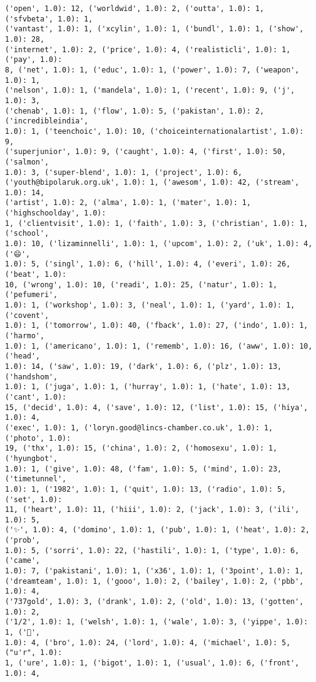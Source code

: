 \documentclass[11pt]{article}
\begin{document}
\begin{Verbatim}[commandchars=\\\{\}]
('open', 1.0): 12, ('worldwid', 1.0): 2, ('outta', 1.0): 1, ('sfvbeta', 1.0): 1,
('vantast', 1.0): 1, ('xcylin', 1.0): 1, ('bundl', 1.0): 1, ('show', 1.0): 28,
('internet', 1.0): 2, ('price', 1.0): 4, ('realisticli', 1.0): 1, ('pay', 1.0):
8, ('net', 1.0): 1, ('educ', 1.0): 1, ('power', 1.0): 7, ('weapon', 1.0): 1,
('nelson', 1.0): 1, ('mandela', 1.0): 1, ('recent', 1.0): 9, ('j', 1.0): 3,
('chenab', 1.0): 1, ('flow', 1.0): 5, ('pakistan', 1.0): 2, ('incredibleindia',
1.0): 1, ('teenchoic', 1.0): 10, ('choiceinternationalartist', 1.0): 9,
('superjunior', 1.0): 9, ('caught', 1.0): 4, ('first', 1.0): 50, ('salmon',
1.0): 3, ('super-blend', 1.0): 1, ('project', 1.0): 6,
('youth@bipolaruk.org.uk', 1.0): 1, ('awesom', 1.0): 42, ('stream', 1.0): 14,
('artist', 1.0): 2, ('alma', 1.0): 1, ('mater', 1.0): 1, ('highschoolday', 1.0):
1, ('clientvisit', 1.0): 1, ('faith', 1.0): 3, ('christian', 1.0): 1, ('school',
1.0): 10, ('lizaminnelli', 1.0): 1, ('upcom', 1.0): 2, ('uk', 1.0): 4, ('😄',
1.0): 5, ('singl', 1.0): 6, ('hill', 1.0): 4, ('everi', 1.0): 26, ('beat', 1.0):
10, ('wrong', 1.0): 10, ('readi', 1.0): 25, ('natur', 1.0): 1, ('pefumeri',
1.0): 1, ('workshop', 1.0): 3, ('neal', 1.0): 1, ('yard', 1.0): 1, ('covent',
1.0): 1, ('tomorrow', 1.0): 40, ('fback', 1.0): 27, ('indo', 1.0): 1, ('harmo',
1.0): 1, ('americano', 1.0): 1, ('rememb', 1.0): 16, ('aww', 1.0): 10, ('head',
1.0): 14, ('saw', 1.0): 19, ('dark', 1.0): 6, ('plz', 1.0): 13, ('handshom',
1.0): 1, ('juga', 1.0): 1, ('hurray', 1.0): 1, ('hate', 1.0): 13, ('cant', 1.0):
15, ('decid', 1.0): 4, ('save', 1.0): 12, ('list', 1.0): 15, ('hiya', 1.0): 4,
('exec', 1.0): 1, ('loryn.good@lincs-chamber.co.uk', 1.0): 1, ('photo', 1.0):
19, ('thx', 1.0): 15, ('china', 1.0): 2, ('homosexu', 1.0): 1, ('hyungbot',
1.0): 1, ('give', 1.0): 48, ('fam', 1.0): 5, ('mind', 1.0): 23, ('timetunnel',
1.0): 1, ('1982', 1.0): 1, ('quit', 1.0): 13, ('radio', 1.0): 5, ('set', 1.0):
11, ('heart', 1.0): 11, ('hiii', 1.0): 2, ('jack', 1.0): 3, ('ili', 1.0): 5,
('✨', 1.0): 4, ('domino', 1.0): 1, ('pub', 1.0): 1, ('heat', 1.0): 2, ('prob',
1.0): 5, ('sorri', 1.0): 22, ('hastili', 1.0): 1, ('type', 1.0): 6, ('came',
1.0): 7, ('pakistani', 1.0): 1, ('x36', 1.0): 1, ('3point', 1.0): 1,
('dreamteam', 1.0): 1, ('gooo', 1.0): 2, ('bailey', 1.0): 2, ('pbb', 1.0): 4,
('737gold', 1.0): 3, ('drank', 1.0): 2, ('old', 1.0): 13, ('gotten', 1.0): 2,
('1/2', 1.0): 1, ('welsh', 1.0): 1, ('wale', 1.0): 3, ('yippe', 1.0): 1, ('💟',
1.0): 4, ('bro', 1.0): 24, ('lord', 1.0): 4, ('michael', 1.0): 5, ("u'r", 1.0):
1, ('ure', 1.0): 1, ('bigot', 1.0): 1, ('usual', 1.0): 6, ('front', 1.0): 4,

\end{Verbatim}
\end{document}
